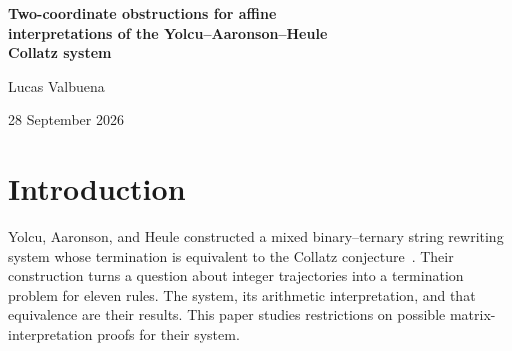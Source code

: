\documentclass[11pt,a4paper]{article}
\begin{document}
\thispagestyle{plain}
\begin{center}
{\LARGE\bfseries Two-coordinate obstructions for affine\\[3pt]interpretations of the Yolcu--Aaronson--Heule\\[3pt]Collatz system\par}
\vspace{8pt}
{\large Lucas Valbuena\par}
\vspace{4pt}
{\normalsize 28 September 2026}
\end{center}
\vspace{2pt}
\begin{abstract}
We prove two obstructions to matrix-interpretation proofs for the
eleven-rule Collatz system of Yolcu, Aaronson, and Heule.
For nonnegative real affine maps in two coordinates, if every symbol
matrix has first diagonal entry at least one, weak orientation of all
eleven rules forces every first-coordinate offset gap to vanish.
This holds separately for the original and word-reversed systems,
with arbitrary admissible boundary maps and no coefficient bound.
For the reversed system we also remove every diagonal lower bound:
nonnegativity and the eleven weak comparisons alone force equality of
the offset vectors in both rules eligible for the reversed TOP step,
$da\to d$ and $db\to dg$. Thus neither rule can have a positive
uniform decrement in this two-coordinate real affine format.
The proofs include singular matrices and zero entries. We give the
matrix and scalar classifications, the resonance calculation, and the
growth argument underlying the unrestricted reversed result.
For the forward system in arbitrary finite dimension, we also prove
a five-stage growth bound for the three root gaps and show that a
positive contracting left row for the binary matrix makes them vanish.
Lean~4 checks these results and their supporting algebra.
The unrestricted forward TOP problem, unrestricted higher dimensions,
and the Collatz conjecture remain unresolved by these results.
\end{abstract}

\section{Introduction}
Yolcu, Aaronson, and Heule constructed a mixed binary--ternary string
rewriting system whose termination is equivalent to the Collatz
conjecture~\cite[Theorem~3.17]{yah}. Their construction turns a question
about integer trajectories into a termination problem for eleven rules.
The system, its arithmetic interpretation, and that equivalence are
their results. This paper studies restrictions on possible
matrix-interpretation proofs for their system.
\end{document}
